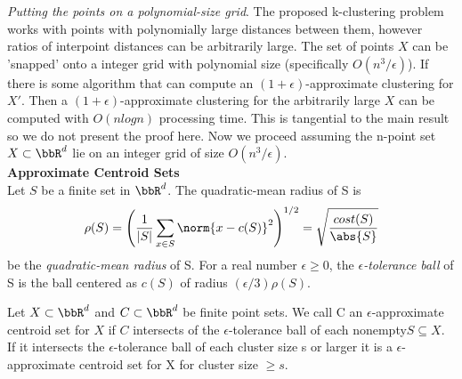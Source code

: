 \noindent \emph{Putting the points on a polynomial-size grid}. The proposed k-clustering problem works with points with polynomially large distances between them, however ratios of interpoint distances can be arbitrarily large. The set of points $X$ can be 'snapped' onto a integer grid with polynomial size (specifically $O(n^3/\epsilon)$). If there is some algorithm that can compute an $(1+\epsilon)$-approximate clustering for $X'$. Then a $(1+\epsilon)$-approximate clustering for the arbitrarily large $X$ can be computed with $O(nlogn)$ processing time. This is tangential to the main result so we do not present the proof here. Now we proceed assuming the n-point set $X \subset \bbR^d$ lie on an integer grid of size $O(n^3/\epsilon)$.\\

\noindent \textbf{Approximate Centroid Sets}\\
Let $S$ be a finite set in $\bbR^d$. The quadratic-mean radius of S is
\begin{align}
    \rho(S)  = \left( \frac{1}{|S|}\sum_{x\in S}\norm{x-c(S)}^2\right)^{1/2}
    = \sqrt{\frac{cost(S)}{\abs{S}}}
\end{align} 
be the \emph{quadratic-mean radius} of S. For a real number $\epsilon \geq 0$, the \emph{$\epsilon$-tolerance ball} of S is the ball centered as $c(S)$ of radius $(\epsilon/3)\rho(S)$.
\begin{definition}
Let $X \subset \bbR^d$ and $C \subset \bbR^d$ be finite point sets. We call C an $\epsilon$-approximate centroid set for $X$ if $C$ intersects of the $\epsilon$-tolerance ball of each nonempty$ S \subseteq X$. If it intersects the $\epsilon$-tolerance ball  of each cluster size s or larger it is a $\epsilon$-approximate centroid set for X for cluster size $\geq s$.
\end{definition}

